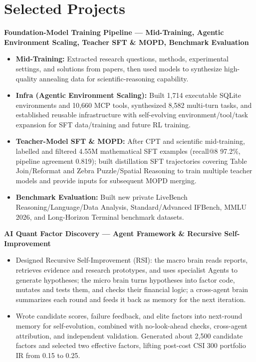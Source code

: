\documentclass[9pt,a4paper]{article}
\newcommand{\project}[1]{\vspace{1.5pt}\textbf{#1}\par}
\begin{document}
\section{Selected Projects}
\project{Foundation-Model Training Pipeline --- Mid-Training, Agentic Environment Scaling, Teacher SFT \& MOPD, Benchmark Evaluation}
\begin{itemize}
  \item \textbf{Mid-Training:} Extracted research questions, methods, experimental settings, and solutions from papers, then used models to synthesize high-quality annealing data for scientific-reasoning capability.
  \item \textbf{Infra (Agentic Environment Scaling):} Built 1,714 executable SQLite environments and 10,660 MCP tools, synthesized 8,582 multi-turn tasks, and established reusable infrastructure with self-evolving environment/tool/task expansion for SFT data/training and future RL training.
  \item \textbf{Teacher-Model SFT \& MOPD:} After CPT and scientific mid-training, labelled and filtered 4.55M mathematical SFT examples (recall@8 97.2\%, pipeline agreement 0.819); built distillation SFT trajectories covering Table Join/Reformat and Zebra Puzzle/Spatial Reasoning to train multiple teacher models and provide inputs for subsequent MOPD merging.
  \item \textbf{Benchmark Evaluation:} Built new private LiveBench Reasoning/Language/Data Analysis, Standard/Advanced IFBench, MMLU 2026, and Long-Horizon Terminal benchmark datasets.
\end{itemize}

\project{AI Quant Factor Discovery --- Agent Framework \& Recursive Self-Improvement}
\begin{itemize}
  \item Designed Recursive Self-Improvement (RSI): the macro brain reads reports, retrieves evidence and research prototypes, and uses specialist Agents to generate hypotheses; the micro brain turns hypotheses into factor code, mutates and tests them, and checks their financial logic; a cross-agent brain summarizes each round and feeds it back as memory for the next iteration.
  \item Wrote candidate scores, failure feedback, and elite factors into next-round memory for self-evolution, combined with no-look-ahead checks, cross-agent attribution, and independent validation. Generated about 2,500 candidate factors and selected two effective factors, lifting post-cost CSI 300 portfolio IR from 0.15 to 0.25.
\end{itemize}
\end{document}
